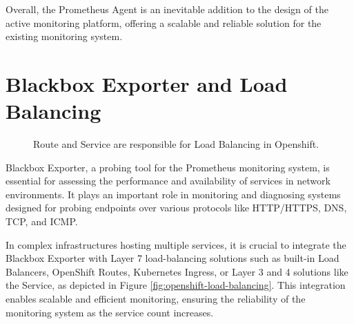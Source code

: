 Overall, the Prometheus Agent is an inevitable addition to the design of the active monitoring platform, offering a scalable and reliable solution for the existing monitoring system.

\section{Blackbox Exporter and Load Balancing}

\begin{figure}[htpb]
  \centering
  \caption[OpenShift Load Balancing]{Route and Service are responsible for Load Balancing in Openshift.}\label{fig:openshift-load-balancing}
\end{figure}

Blackbox Exporter, a probing tool for the Prometheus monitoring system, is essential for assessing the performance and availability of services in network environments. It plays an important role in monitoring and diagnosing systems designed for probing endpoints over various protocols like \ac{HTTP}/\ac{HTTPS}, \ac{DNS}, \ac{TCP}, and \ac{ICMP}. 

In complex infrastructures hosting multiple services, it is crucial to integrate the Blackbox Exporter with Layer 7 load-balancing solutions such as built-in Load Balancers, OpenShift Routes, Kubernetes Ingress, or Layer 3 and 4 solutions like the Service, as depicted in Figure \autoref{fig:openshift-load-balancing}. This integration enables scalable and efficient monitoring, ensuring the reliability of the monitoring system as the service count increases. 

